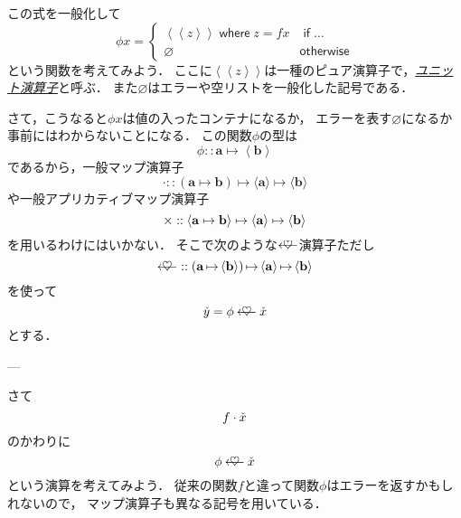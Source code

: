\documentclass[a4paper,draft]{jsbook}
\newcommand{\keyword}[1]{{\underline{\emph{#1}}}}
\DeclareMathOperator{\mMapsTo}{\mapsto}
\newcommand{\mathTypeParameter}[1]{\mathbf{#1}}
\newcommand{\mathContainerVar}[1]{\Check{#1}}
\newcommand{\mathPureWith}[1]{\left\langle#1\right\rangle}
\newcommand{\mathUnitWith}[1]{\left\langle\!\left\langle#1\right\rangle\!\right\rangle}
\newcommand{\mathPureType}[1]{\mathPureWith{\mathTypeParameter{#1}}}
\newcommand{\mathPureNothing}{\varnothing}
\newcommand{\mathApplicativeGeneralMap}{\mathbin{\times}}
\newcommand{\mathBind}{\mathbin{\ooalign{$\longleftarrow$\crcr\hss$\heartsuit$\hss}}}
\newcommand{\mathGeneralMap}{\mathbin{\cdot}}
\newcommand{\mathIn}{\mathrel{::}}
\newcommand{\mathMapsTo}{\mapsto}
\newcommand{\mathKeyword}[1]{\operatorname{\textsf{#1}}}
\newcommand{\mathIf}{\mathKeyword{if}}
\newcommand{\mathOtherwise}{\mathKeyword{otherwise}}
\newcommand{\mathWhere}{\mathKeyword{where}}
\newcommand{\mathMorph}[2]{#1\mathMapsTo#2}
\newcommand{\mathMorphII}[3]{#1\mathMapsTo#2\mathMapsTo#3}
\begin{document}
この式を一般化して
\begin{equation}
\phi x=\begin{cases}
\mathUnitWith{z}\mathWhere z=fx&\mathIf\dots\\
\mathPureNothing&\mathOtherwise
\end{cases}
\end{equation}
という関数を考えてみよう．
ここに$\mathUnitWith{z}$は一種のピュア演算子で，\keyword{ユニット演算子}と呼ぶ．
また$\mathPureNothing$はエラーや空リストを一般化した記号である．

さて，こうなると$\phi x$は値の入ったコンテナになるか，
エラーを表す$\mathPureNothing$になるか事前にはわからないことになる．
この関数$\phi$の型は
\begin{equation}
  \phi\mathIn\mathTypeParameter{a}\mMapsTo\mathPureWith{\mathTypeParameter{b}}
\end{equation}
であるから，一般マップ演算子
\begin{equation}
\mathGeneralMap
\mathIn{}\mathMorphII{(\mathMorph{\mathTypeParameter{a}}{\mathTypeParameter{b}})}{\langle\mathTypeParameter{a}\rangle}{\langle\mathTypeParameter{b}\rangle}
\end{equation}
や一般アプリカティブマップ演算子
\begin{equation}
\mathApplicativeGeneralMap
\mathIn{}\mathMorphII{\langle\mathMorph{\mathTypeParameter{a}}{\mathTypeParameter{b}}\rangle}{\langle\mathTypeParameter{a}\rangle}{\langle\mathTypeParameter{b}\rangle}\\
\end{equation}
を用いるわけにはいかない．
そこで次のような$\mathBind$演算子ただし
\begin{equation}
\mathBind
\mathIn
\left(\mathTypeParameter{a}\mMapsTo\mathPureType{b}\right)
\mMapsTo
\mathPureType{a}
\mMapsTo
\mathPureType{b}
\end{equation}
を使って
\begin{equation}
  \mathContainerVar{y}=\phi\mathBind\mathContainerVar{x}
\end{equation}
とする．

---

さて
\begin{equation}
  f\mathGeneralMap\mathContainerVar{x}
\end{equation}
のかわりに
\begin{equation}
  \phi\mathBind\mathContainerVar{x}
\end{equation}
という演算を考えてみよう．
従来の関数$f$と違って関数$\phi$はエラーを返すかもしれないので，
マップ演算子も異なる記号を用いている．
\end{document}
